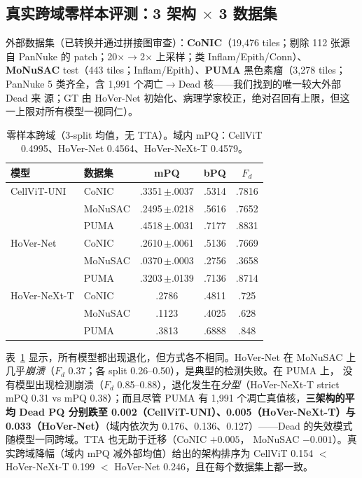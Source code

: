 \documentclass[11pt]{article}
\begin{document}
\subsection{真实跨域零样本评测：3 架构 $\times$ 3 数据集}
\label{sec:external}

外部数据集（已转换并通过拼接图审查）：\textbf{CoNIC}（19,476 tiles；剔除 112 张源自
PanNuke 的 patch；20$\times\rightarrow$2$\times$ 上采样；类 Inflam/Epith/Conn）、
\textbf{MoNuSAC} test（443 tiles；Inflam/Epith）、\textbf{PUMA} 黑色素瘤（3,278 tiles；
PanNuke 5 类齐全，含 1,991 个凋亡$\rightarrow$Dead 核——我们找到的唯一较大外部 Dead 来
源；GT 由 HoVer-Net 初始化、病理学家校正，绝对召回有上限，但这一上限对所有模型一视同仁）。

\begin{table}[t]
\centering\small
\caption{零样本跨域（3-split 均值，无 TTA）。域内 mPQ：CellViT 0.4995、HoVer-Net
0.4564、HoVer-NeXt-T 0.4579。}
\label{tab:external}
\begin{tabular}{llccc}
\toprule
模型 & 数据集 & mPQ & bPQ & $F_d$ \\
\midrule
CellViT-UNI  & CoNIC   & .3351\,$\pm$.0037 & .5314 & .7816 \\
             & MoNuSAC & .2495\,$\pm$.0218 & .5616 & .7652 \\
             & PUMA    & .4518\,$\pm$.0031 & .7177 & .8831 \\
\midrule
HoVer-Net    & CoNIC   & .2610\,$\pm$.0061 & .5136 & .7669 \\
             & MoNuSAC & .0370\,$\pm$.0003 & .2756 & .3658 \\
             & PUMA    & .3203\,$\pm$.0139 & .7136 & .8714 \\
\midrule
HoVer-NeXt-T & CoNIC   & .2786 & .4811 & .725 \\
             & MoNuSAC & .1123 & .4025 & .628 \\
             & PUMA    & .3813 & .6888 & .848 \\
\bottomrule
\end{tabular}
\end{table}

表~\ref{tab:external} 显示，所有模型都出现退化，但方式各不相同。HoVer-Net 在 MoNuSAC
上几乎\emph{崩溃}（$F_d$ 0.37；各 split 0.26--0.50），是典型的检测失败。在 PUMA 上，
没有模型出现检测崩溃（$F_d$ 0.85--0.88），退化发生在\emph{分型}（HoVer-NeXt-T strict
mPQ 0.31 vs mPQ 0.38）；而且尽管 PUMA 有 1,991 个凋亡真值核，\textbf{三架构的平均 Dead PQ
分别跌至 0.002（CellViT-UNI）、0.005（HoVer-NeXt-T）与 0.033（HoVer-Net）}（域内依次为
0.176、0.136、0.127）——Dead 的失效模式随模型一同跨域。TTA 也无助于迁移（CoNIC $+0.005$，
MoNuSAC $-0.001$）。真实跨域降幅（域内 mPQ 减外部均值）给出的架构排序为 CellViT 0.154
$<$ HoVer-NeXt-T 0.199 $<$ HoVer-Net 0.246，且在每个数据集上都一致。
\end{document}
